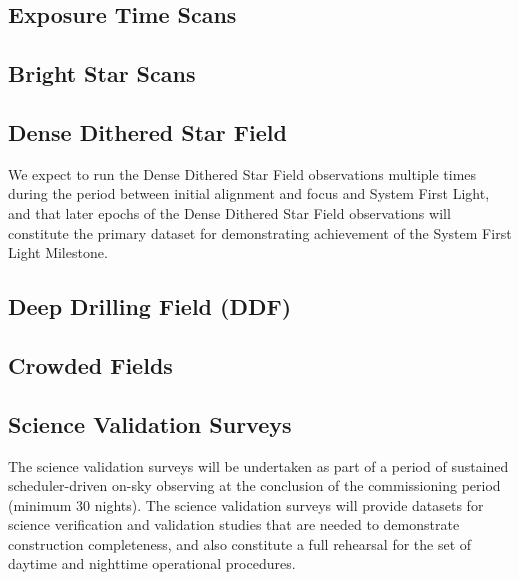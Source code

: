 \documentclass[SE,authoryear,toc,lsstdraft]{lsstdoc}
\begin{document}


\subsection{Exposure Time Scans}



\subsection{Bright Star Scans}



\subsection{Dense Dithered Star Field}

We expect to run the Dense Dithered Star Field observations multiple times during the period between initial alignment and focus and System First Light, and that later epochs of the Dense Dithered Star Field observations will constitute the primary dataset for demonstrating achievement of the System First Light Milestone.



\subsection{Deep Drilling Field (DDF)}



\subsection{Crowded Fields}


%

\subsection{Science Validation Surveys}

The science validation surveys will be undertaken as part of a period of sustained scheduler-driven on-sky observing at the conclusion of the commissioning period (minimum 30 nights).
The science validation surveys will provide datasets for science verification and validation studies that are needed to demonstrate construction completeness, and also constitute a full rehearsal for the set of daytime and nighttime operational procedures.
\end{document}
